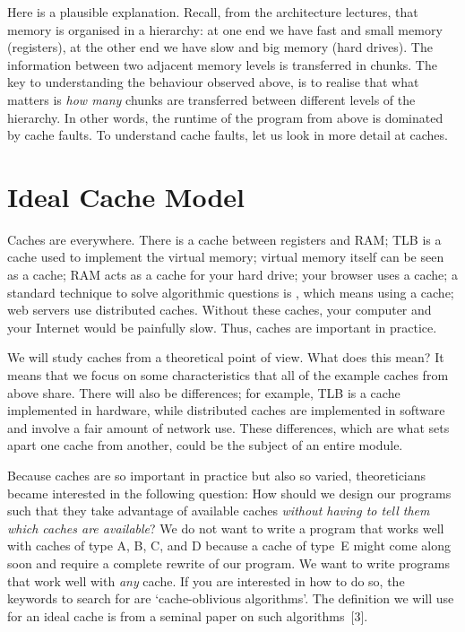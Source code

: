 Here is a plausible explanation.
Recall, from the architecture lectures,
  that memory is organised in a hierarchy:
  at one end we have fast and small memory (registers),
  at the other end we have slow and big memory (hard drives).
The information between two adjacent memory levels is transferred in chunks.
The key to understanding the behaviour observed above,
  is to realise that what matters is
    \emph{how many} chunks are transferred between different levels of the hierarchy.
In other words,
  the runtime of the program from above is dominated by cache faults.
To understand cache faults,
  let us look in more detail at caches.


\section*{Ideal Cache Model}

Caches are everywhere.
There is a cache between registers and RAM;
  TLB is a cache used to implement the virtual memory;
  virtual memory itself can be seen as a cache;
  RAM acts as a cache for your hard drive;
  your browser uses a cache;
  a standard technique to solve algorithmic questions is ,
    which means using a cache;
  web servers use distributed caches.
Without these caches, your computer and your Internet would be painfully slow.
Thus, caches are important in practice.

We will study caches from a theoretical point of view.
What does this mean?
It means that we focus on some characteristics
  that all of the example caches from above share.
There will also be differences; for example,
  TLB is a cache implemented in hardware,
  while distributed caches are implemented in software
    and involve a fair amount of network use.
These differences, which are what sets apart one cache from another,
  could be the subject of an entire module.

Because caches are so important in practice but also so varied,
  theoreticians became interested in the following question:
How should we design our programs such that they take advantage of available caches
  \emph{without having to tell them which caches are available}?
We do not want to write a program that works well with caches of type
  A, B, C, and D because a cache of type~E might come along soon
  and require a complete rewrite of our program.
We want to write programs that work well with \emph{any} cache.
If you are interested in how to do so,
  the keywords to search for are `cache-oblivious algorithms'.
The definition we will use for an ideal cache
  is from a seminal paper on such algorithms~[3].

